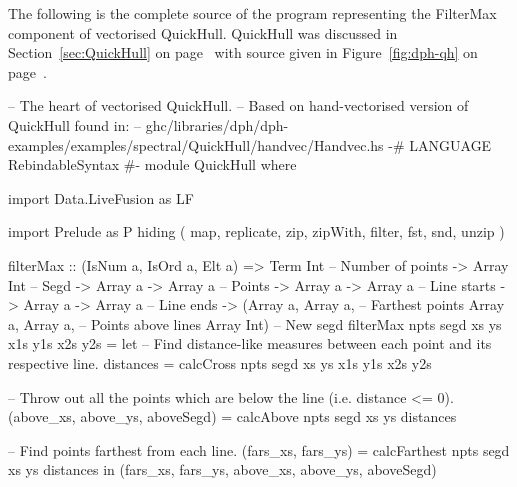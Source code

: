\documentclass[preamble.tex]{subfiles}
\begin{document}
The following is the complete source of the program representing the FilterMax component of vectorised QuickHull. QuickHull was discussed in Section~\ref{sec:QuickHull} on page~\pageref{sec:QuickHull} with  source given in Figure~\ref{fig:dph-qh} on page~\pageref{fig:dph-qh}.


\begin{hscode}
-- The heart of vectorised QuickHull.
-- Based on hand-vectorised version of QuickHull found in:
-- ghc/libraries/dph/dph-examples/examples/spectral/QuickHull/handvec/Handvec.hs
{-# LANGUAGE RebindableSyntax #-}
module QuickHull where

import Data.LiveFusion as LF

import Prelude as P hiding ( map, replicate, zip, zipWith,
                             filter, fst, snd, unzip )

filterMax :: (IsNum a, IsOrd a, Elt a)
          => Term Int            -- Number of points
          -> Array Int           -- Segd
          -> Array a -> Array a  -- Points
          -> Array a -> Array a  -- Line starts
          -> Array a -> Array a  -- Line ends
          -> (Array a, Array a,  -- Farthest points
              Array a, Array a,  -- Points above lines
              Array Int)         -- New segd
filterMax npts segd xs ys x1s y1s x2s y2s
  = let -- Find distance-like measures between each point and its respective line.
        distances = calcCross npts segd xs ys x1s y1s x2s y2s

        -- Throw out all the points which are below the line (i.e. distance <= 0).
        (above_xs, above_ys, aboveSegd) = calcAbove npts segd xs ys distances

        -- Find points farthest from each line.
        (fars_xs, fars_ys) = calcFarthest npts segd xs ys distances
    in  (fars_xs, fars_ys, above_xs, above_ys, aboveSegd)


\end{hscode}
\end{document}
